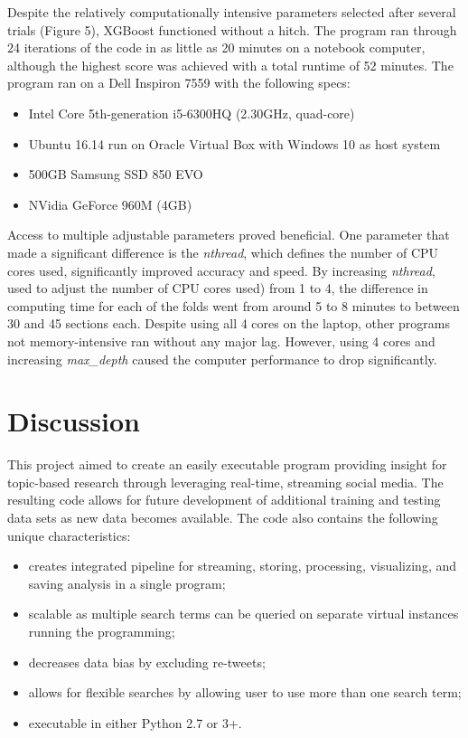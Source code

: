Despite the relatively computationally intensive parameters selected
after several trials (Figure 5), XGBoost functioned without a hitch.
The program ran through 24 iterations of the code in as little as 20
minutes on a notebook computer, although the highest score was
achieved with a total runtime of 52 minutes.  The program ran on a
Dell Inspiron 7559 with the following specs:

\begin{itemize}
\item Intel Core 5th-generation i5-6300HQ (2.30GHz, quad-core)
\item Ubuntu 16.14 run on Oracle Virtual Box with Windows 10 as host
  system
\item 500GB Samsung SSD 850 EVO
\item NVidia GeForce 960M (4GB)
\end{itemize}

Access to multiple adjustable parameters proved beneficial.  One
parameter that made a significant difference is the \emph{nthread},
which defines the number of CPU cores used, significantly improved
accuracy and speed.  By increasing \emph{nthread}, used to adjust the
number of CPU cores used) from 1 to 4, the difference in computing
time for each of the folds went from around 5 to 8 minutes to between
30 and 45 sections each.  Despite using all 4 cores on the laptop,
other programs not memory-intensive ran without any major lag.
However, using 4 cores and increasing \emph{max\_depth} caused the
computer performance to drop significantly.

\section{Discussion}

This project aimed to create an easily executable program providing
insight for topic-based research through leveraging real-time,
streaming social media.  The resulting code allows for future
development of additional training and testing data sets as new data
becomes available.  The code also contains the following unique
characteristics:

\begin{itemize}
\item creates integrated pipeline for streaming,
storing, processing, visualizing, and saving
analysis in a single program; 
\item scalable as multiple search terms can be queried on separate virtual 
instances running the programming; 
\item decreases data bias by excluding re-tweets;
\item allows for flexible searches by allowing
user to use more than one search term;
\item executable in either Python 2.7 or 3+.
\end{itemize}

